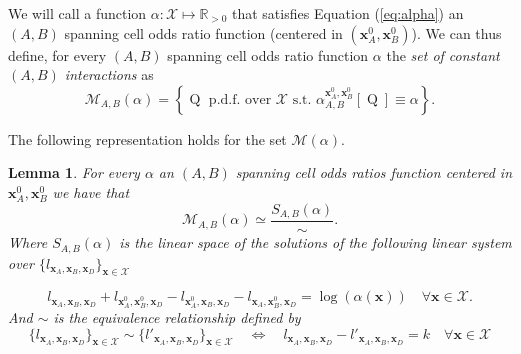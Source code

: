 \documentclass[11pt,a4paper, twoside]{book}
\newtheorem{lemma}{Lemma}[chapter]
\newcommand{\Pq}{\operatorname{Q}}
\newcommand{\bchi}{\boldsymbol{\mathcal{X}}}
\begin{document}
We will call a function $\alpha: \bchi \mapsto \mathbb{R}_{>0}$ that satisfies Equation (\ref{eq:alpha}) an $(A,B)$ spanning cell odds ratio function (centered in $(\mathbf{x}^0_A ,  \mathbf{x}^0_B )$). We can thus define, for every $(A,B)$ spanning cell odds ratio function $\alpha$ the \textit{set of constant $(A,B)$ interactions} as 
$$ \mathcal{M}_{A,B}(\alpha)= \left\{ \Pq \text{ p.d.f. over } \bchi \text{ s.t. }  \alpha^{\mathbf{x}^0_A, \mathbf{x}^0_B}_{A,B}[\Pq]\equiv \alpha \right\} .$$

The following representation holds for the set $\mathcal{M}(\alpha)$.

\begin{lemma}
For every $\alpha$ an $(A,B)$ spanning cell odds ratios function centered in $\mathbf{x}^0_A,\mathbf{x}^0_B$ we have that 
$$\mathcal{M}_{A,B}(\alpha) \simeq \frac{S_{A,B}(\alpha)}{\sim}.$$
Where $S_{A,B}(\alpha)$ is the linear space of the solutions of the following linear system over $\{l_{\mathbf{x}_A,\mathbf{x}_B,\mathbf{x}_D} \}_{\mathbf{x}\in\bchi}$

\begin{equation}
\label{eq:systemOR} l_{\mathbf{x}_A,\mathbf{x}_B,\mathbf{x}_D} + l_{\mathbf{x}^0_A,\mathbf{x}^0_B,\mathbf{x}_D} - l_{\mathbf{x}^0_A,\mathbf{x}_B,\mathbf{x}_D} -l_{\mathbf{x}_A,\mathbf{x}^0_B,\mathbf{x}_D}= \log(\alpha(\mathbf{x})) \quad \forall \mathbf{x}\in\bchi.     \end{equation}
And $\sim$ is the equivalence relationship defined by 
$$
\{l_{\mathbf{x}_A,\mathbf{x}_B,\mathbf{x}_D} \}_{\mathbf{x}\in\bchi} \sim \{l'_{\mathbf{x}_A,\mathbf{x}_B,\mathbf{x}_D} \}_{\mathbf{x}\in\bchi} \quad \Leftrightarrow \quad l_{\mathbf{x}_A,\mathbf{x}_B,\mathbf{x}_D} - l'_{\mathbf{x}_A,\mathbf{x}_B,\mathbf{x}_D} = k \quad \forall \mathbf{x} \in \bchi  
$$\end{lemma}
\end{document}
